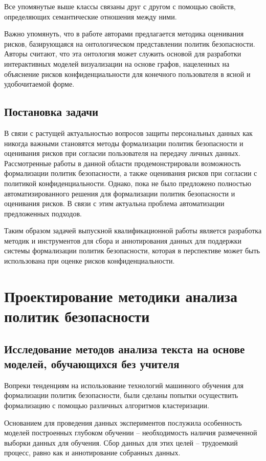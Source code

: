 \documentclass[../main]{subfiles}
\begin{document}
Все упомянутые выше классы связаны друг с другом с помощью свойств, определяющих семантические отношения между ними.

Важно упомянуть, что в работе \cite{P2Onto} авторами предлагается методика оценивания рисков, базирующаяся на онтологическом представлении политик безопасности. Авторы \cite{P2Onto} считают, что эта онтология может служить основой для разработки интерактивных моделей визуализации на основе графов, нацеленных на объяснение рисков конфиденциальности для конечного пользователя в ясной и удобочитаемой форме. 

\subsection{Постановка задачи}
В связи с растущей актуальностью вопросов защиты персональных данных как никогда важными становятся методы формализации политик безопасности и оценивания рисков при согласии пользователя на передачу личных данных. Рассмотренные работы в данной области продемонстрировали возможность формализации политик безопасности, а также оценивания рисков при согласии с политикой конфиденциальности. Однако, пока не было предложено полностью автоматизированного решения для формализации политик безопасности и оценивания рисков. В связи с этим актуальна проблема автоматизации предложенных подходов. 

Таким образом задачей выпускной квалификационной работы является разработка методик и инструментов для сбора и аннотирования данных для поддержки системы формализации политик безопасности, которая в перспективе может быть использована при оценке рисков конфиденциальности.

\newpage
\section{Проектирование методики анализа политик безопасности}

\subsection{Исследование методов анализа текста на основе моделей, обучающихся без учителя}

Вопреки тенденциям на использование технологий машинного обучения для формализации политик безопасности, были сделаны попытки осуществить формализацию с помощью различных алгоритмов кластеризации.

Основанием для проведения данных экспериментов послужила особенность моделей построенных глубоком обучении -- необходимость наличия размеченной выборки данных для обучения. Сбор данных для этих целей -- трудоемкий процесс, равно как и аннотирование собранных данных.
\end{document}
